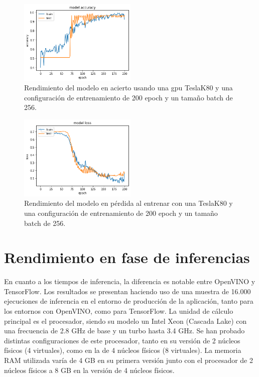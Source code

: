 \begin{figure}
    \centering
    \includegraphics[width=0.5\textwidth]{images/chapter5/batch_256_200_epoch.png}
    \caption{Rendimiento del modelo en acierto usando una gpu TeslaK80 y una configuración de entrenamiento de 200 epoch y un tamaño batch de 256.}
    \label{fig:Resultados de la precisión de entrenamiento con un batch-size de 256 y 200 epochs}
\end{figure}

\begin{figure}
    \centering
    \includegraphics[width=0.5\textwidth]{images/chapter5/batch_256_200_epoch_loss.png}
    \caption{Rendimiento del modelo en pérdida al entrenar con una TeslaK80 y una configuración de entrenamiento de 200 epoch y un tamaño batch de 256.}
    \label{fig:Resultados de loss en el entrenamiento con un batch-size de 256 y 200 epochs}
\end{figure}


\section{Rendimiento en fase de inferencias}\label{sec:ren-dimiento-en-fase-de-inferencias}
En cuanto a los tiempos de inferencia, la diferencia es notable entre OpenVINO y TensorFlow.
Los resultados se presentan haciendo uso de una muestra de 16.000 ejecuciones de inferencia en el entorno de producción de la aplicación, tanto para los entornos con OpenVINO, como para TensorFlow.
La unidad de cálculo principal es el procesador, siendo su modelo un Intel Xeon (Cascada Lake) con una frecuencia de 2.8 GHz de base y un turbo hasta 3.4 GHz.
Se han probado distintas configuraciones de este procesador, tanto en su versión de 2 núcleos físicos (4 virtuales), como en la de 4 núcleos físicos (8 virtuales).
La memoria RAM utilizada varía de 4 GB en su primera versión junto con el procesador de 2 núcleos físicos a 8 GB en la versión de 4 núcleos físicos.

